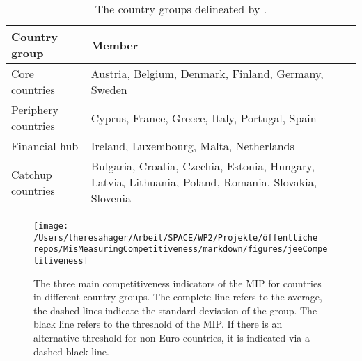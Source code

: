 \documentclass[
]{article}
\begin{document}
\begin{table}
\centering
\caption{The country groups delineated by \citet{Graebner:2020jee}.}
\label{tab:countrygroup}
\begin{tabular}{L{0.2\textwidth}L{0.7\textwidth}}
\toprule
\textbf{Country group} & \textbf{Member}\\
\midrule
Core countries        & Austria, Belgium, Denmark, Finland, Germany, Sweden \\
Periphery countries    & Cyprus, France, Greece, Italy, Portugal, Spain      \\
Financial hub         & Ireland, Luxembourg, Malta, Netherlands             \\
Catchup countries     & Bulgaria, Croatia, Czechia, Estonia, Hungary, Latvia, Lithuania, Poland, Romania, Slovakia, Slovenia \\
\bottomrule
\end{tabular}
\end{table}

\begin{figure}

{\centering \texttt{[image: /Users/theresahager/Arbeit/SPACE/WP2/Projekte/öffentliche repos/MisMeasuringCompetitiveness/markdown/figures/jeeCompetitiveness]} 

}

\caption{The three main competitiveness indicators of the MIP for countries in different country groups. The complete line refers to the average, the dashed lines indicate the standard deviation of the group. The black line refers to the threshold of the MIP. If there is an alternative threshold for non-Euro countries, it is indicated via a dashed black line.}\label{fig:jeeCompetitiveness}
\end{figure}
\end{document}
